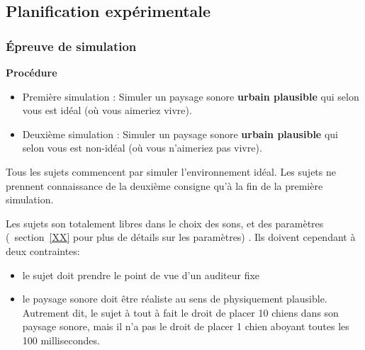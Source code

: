 \subsection{Planification expérimentale}

\subsubsection{Épreuve de simulation}
\label{sec:ch5_planExpSimu}

\textbf{Procédure} \\

\begin{itemize}
\item Première simulation : Simuler un paysage sonore \textbf{urbain plausible} qui selon vous est idéal (où vous aimeriez vivre).
\item Deuxième simulation : Simuler un paysage sonore \textbf{urbain plausible} qui selon vous est non-idéal (où vous n'aimeriez pas vivre).
\end{itemize}

Tous les sujets commencent par simuler l'environnement idéal. Les sujets ne prennent connaissance de la deuxième consigne qu'à la fin de la première simulation.

Les sujets son totalement libres dans le choix des sons, et des paramètres (\Cf~section~\ref{XX} pour plus de détails sur les paramètres) . Ils doivent cependant   à deux contraintes:

\begin{itemize}
\item le sujet doit prendre le point de vue d’un auditeur fixe

\item le paysage sonore doit être réaliste au sens de physiquement plausible. Autrement dit, le sujet à tout à fait le droit de placer 10 chiens dans son paysage sonore, mais il n’a pas le droit de placer 1 chien aboyant toutes les 100 millisecondes.

\end{itemize}

